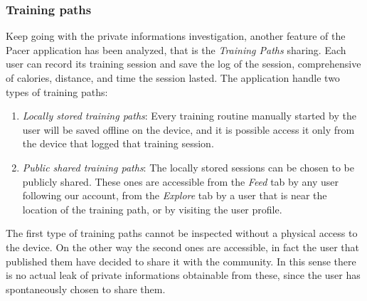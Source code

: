 			\subsubsection{Training paths}
				\par Keep going with the private informations investigation, another feature of the Pacer application has been analyzed, that is the \textit{Training Paths} sharing. Each user can record its training session and save the log of the session, comprehensive of calories, distance, and time the session lasted. The application handle two types of training paths:
				\begin{enumerate}
					\item \textit{Locally stored training paths}: Every training routine manually started by the user will be saved offline on the device, and it is possible access it only from the device that logged that training session. \newline
					\item \textit{Public shared training paths}: The locally stored sessions can be chosen to be publicly shared. These ones are accessible from the \textit{Feed} tab by any user following our account, from the \textit{Explore} tab by a user that is near the location of the training path, or by visiting the user profile.
				\end{enumerate}
				\par The first type of training paths cannot be inspected without a physical access to the device. On the other way the second ones are accessible, in fact the user that published them have decided to share it with the community. In this sense there is no actual leak of private informations obtainable from these, since the user has spontaneously chosen to share them.
				
